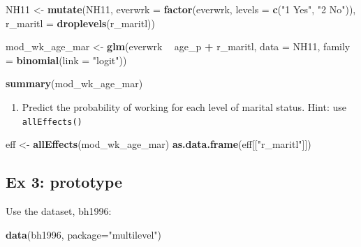 \documentclass[]{book}
\newenvironment{Shaded}{\begin{snugshade}}{\end{snugshade}}
\newcommand{\KeywordTok}[1]{\textcolor[rgb]{0.13,0.29,0.53}{\textbf{#1}}}
\newcommand{\DataTypeTok}[1]{\textcolor[rgb]{0.13,0.29,0.53}{#1}}
\newcommand{\StringTok}[1]{\textcolor[rgb]{0.31,0.60,0.02}{#1}}
\newcommand{\OperatorTok}[1]{\textcolor[rgb]{0.81,0.36,0.00}{\textbf{#1}}}
\newcommand{\NormalTok}[1]{#1}
\providecommand{\tightlist}{%
  \setlength{\itemsep}{0pt}\setlength{\parskip}{0pt}}
\begin{document}
\begin{Shaded}
\begin{Highlighting}[]
\NormalTok{  NH11 <-}\StringTok{ }\KeywordTok{mutate}\NormalTok{(NH11,}
                    \DataTypeTok{everwrk =} \KeywordTok{factor}\NormalTok{(everwrk, }\DataTypeTok{levels =} \KeywordTok{c}\NormalTok{(}\StringTok{"1 Yes"}\NormalTok{, }\StringTok{"2 No"}\NormalTok{)),}
                    \DataTypeTok{r_maritl =} \KeywordTok{droplevels}\NormalTok{(r_maritl))}

\NormalTok{  mod_wk_age_mar <-}\StringTok{ }\KeywordTok{glm}\NormalTok{(everwrk }\OperatorTok{~}\StringTok{ }\NormalTok{age_p }\OperatorTok{+}\StringTok{ }\NormalTok{r_maritl, }\DataTypeTok{data =}\NormalTok{ NH11,}
                        \DataTypeTok{family =} \KeywordTok{binomial}\NormalTok{(}\DataTypeTok{link =} \StringTok{"logit"}\NormalTok{))}

  \KeywordTok{summary}\NormalTok{(mod_wk_age_mar)}
\end{Highlighting}
\end{Shaded}

\begin{enumerate}
\def\labelenumi{\arabic{enumi}.}
\setcounter{enumi}{1}
\tightlist
\item
  Predict the probability of working for each level of marital status.
  Hint: use \texttt{allEffects()}
\end{enumerate}

\begin{Shaded}
\begin{Highlighting}[]
\NormalTok{  eff <-}\StringTok{ }\KeywordTok{allEffects}\NormalTok{(mod_wk_age_mar)}
  \KeywordTok{as.data.frame}\NormalTok{(eff[[}\StringTok{"r_maritl"}\NormalTok{]])}
\end{Highlighting}
\end{Shaded}

\subsection{Ex 3: prototype}\label{ex-3-prototype-1}

Use the dataset, bh1996:

\begin{Shaded}
\begin{Highlighting}[]
  \KeywordTok{data}\NormalTok{(bh1996, }\DataTypeTok{package=}\StringTok{"multilevel"}\NormalTok{)}
\end{Highlighting}
\end{Shaded}
\end{document}
